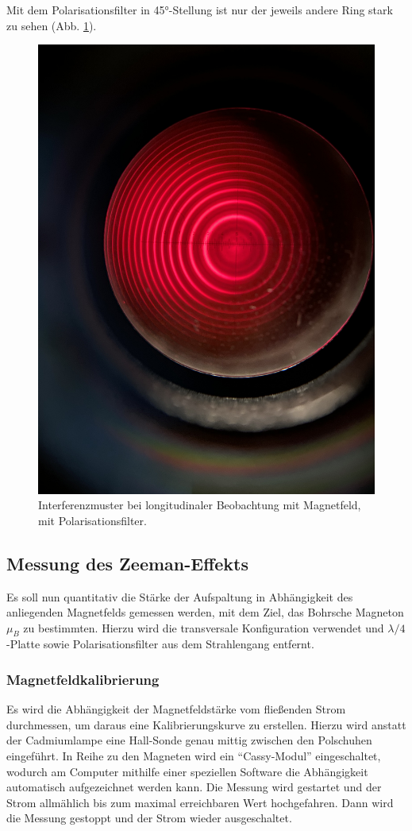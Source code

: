 \documentclass{article}
\begin{document}
\begin{multicols}{2}
Mit dem Polarisationsfilter in \ang{45}-Stellung ist nur der jeweils andere Ring stark zu sehen (Abb. \ref{fig:zeeman-longitudinal-mit-45}).
\begin{figure}[H]
  \centering
  \includegraphics[width=.8\linewidth]{zeeman-longitudinal-mit-45}
  \caption{Interferenzmuster bei longitudinaler Beobachtung mit Magnetfeld, mit Polarisationsfilter.}
  \label{fig:zeeman-longitudinal-mit-45}
\end{figure}


\subsection{Messung des Zeeman-Effekts}
Es soll nun quantitativ die Stärke der Aufspaltung in Abhängigkeit des anliegenden Magnetfelds gemessen werden,
mit dem Ziel, das Bohrsche Magneton $\mu_B$ zu bestimmten.
Hierzu wird die transversale Konfiguration verwendet und $\lambda/4$-Platte sowie Polarisationsfilter aus dem Strahlengang entfernt.

\subsubsection{Magnetfeldkalibrierung}
Es wird die Abhängigkeit der Magnetfeldstärke vom fließenden Strom durchmessen, um daraus eine Kalibrierungskurve zu erstellen.
Hierzu wird anstatt der Cadmiumlampe eine Hall-Sonde genau mittig zwischen den Polschuhen eingeführt.
In Reihe zu den Magneten wird ein \enquote{Cassy-Modul} eingeschaltet,
wodurch am Computer mithilfe einer speziellen Software die Abhängigkeit automatisch aufgezeichnet werden kann.
Die Messung wird gestartet und der Strom allmählich bis zum maximal erreichbaren Wert hochgefahren.
Dann wird die Messung gestoppt und der Strom wieder ausgeschaltet.


\end{multicols}
\end{document}
